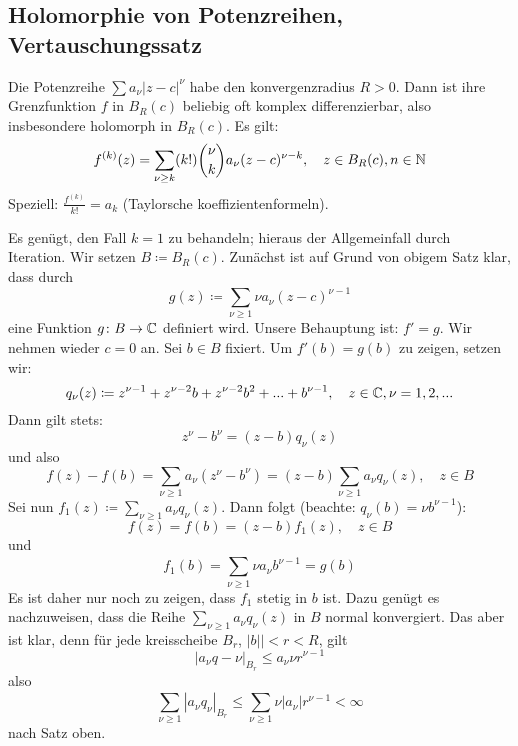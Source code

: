 \subsection*{Holomorphie von Potenzreihen, Vertauschungssatz}
\begin{satz}
	Die Potenzreihe $ \sum a_\nu|z-c|^\nu $ habe den konvergenzradius $ R>0 $. Dann ist ihre Grenzfunktion $ f $ in $ B_R(c) $ beliebig oft komplex differenzierbar, also insbesondere holomorph in $ B_R(c) $. Es gilt:
	\[ f^{(k)}(z)=\sum_{\nu\geq k} (k!)\binom{\nu}{k}a_\nu(z-c)^{\nu-k},\quad z\in B_R(c), n\in\mathbb{N} \]
	Speziell: $ \frac{f^{(k)}}{k!}=a_k $ (Taylorsche koeffizientenformeln).
\end{satz}
\begin{beweis}
	Es gen\"ugt, den Fall $ k=1 $ zu behandeln; hieraus der Allgemeinfall durch Iteration. Wir setzen $ B\coloneqq B_R(c) $. Zun\"achst ist auf Grund von obigem Satz klar, dass durch
	\[ g(z)\coloneqq\sum_{\nu\geq 1} \nu a_\nu(z-c)^{\nu-1} \]
	eine Funktion $ g\colon B\rightarrow\mathbb{C} $ definiert wird. Unsere Behauptung ist: $ f'=g $. Wir nehmen wieder $ c=0 $ an. Sei $ b\in B $ fixiert. Um $ f'(b)=g(b) $ zu zeigen, setzen wir: \[ q_\nu(z)\coloneqq z^{\nu-1}+z^{\nu-2}b+z^{\nu-2}b^2+...+b^{\nu-1},\quad z\in\mathbb{C}, \nu=1,2,... \]
	Dann gilt stets:
	\[ z^\nu-b^\nu=(z-b)q_\nu(z) \]
	und also \[ f(z)-f(b)=\sum_{\nu\geq 1} a_\nu(z^\nu-b^\nu)=(z-b)\sum_{\nu\geq 1} a_\nu q_\nu(z),\quad z\in B \]
	Sei nun $ f_1(z)\coloneqq\sum_{\nu\geq 1}^{} a_\nu q_\nu(z) $. Dann folgt (beachte: $ q_\nu(b)=\nu b^{\nu-1} $):
	\[ f(z)=f(b)=(z-b)f_1(z),\quad z\in B \] und
	\[ f_1(b)=\sum_{\nu\geq 1}^{} \nu a_\nu b^{\nu-1}=g(b) \]
	Es ist daher nur noch zu zeigen, dass $ f_1 $ stetig in $ b $ ist. Dazu gen\"ugt es nachzuweisen, dass die Reihe $ \sum_{\nu\geq 1} a_\nu q_\nu(z) $ in $ B $ normal konvergiert. Das aber ist klar, denn f\"ur jede kreisscheibe $ B_r $, $ |b||<r<R $, gilt
	\[ |a_\nu q-\nu|_{B_r}\leq a_\nu\nu r^{\nu-1} \]
	also
	\[ \sum_{\nu\geq 1}^{}|a_\nu q_\nu|_{B_r}\leq\sum_{\nu\geq 1}^{} \nu|a_\nu|r^{\nu-1}<\infty \]
	nach Satz oben.
\end{beweis}
